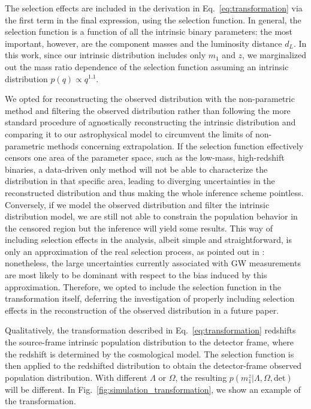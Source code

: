 \documentclass[sn-aps, pdflatex, iicol]{sn-jnl}
\begin{document}
The selection effects are included in the derivation in Eq.~\eqref{eq:transformation} via the first term in the final expression, using the selection function.
In general, the selection function is a function of all the intrinsic binary parameters: the most important, however, are the component masses and the luminosity distance $d_L$.
In this work, since our intrinsic distribution includes only $m_1$ and $z$, we marginalized out the mass ratio dependence of the selection function assuming an intrinsic distribution $p(q) \propto q^{1.1}$.

We opted for reconstructing the observed distribution with the non-parametric method and filtering the observed distribution rather than following the more standard procedure of agnostically reconstructing the intrinsic distribution and comparing it to our astrophysical model to circumvent the limits of non-parametric methods concerning extrapolation.
If the selection function effectively censors one area of the parameter space, such as the low-mass, high-redshift binaries, a data-driven only method will not be able to characterize the distribution in that specific area, leading to diverging uncertainties in the reconstructed distribution and thus making the whole inference scheme pointless. Conversely, if we model the observed distribution and filter the intrinsic distribution model, we are still not able to constrain the population behavior in the censored region but the inference will yield some results.
This way of including selection effects in the analysis, albeit simple and straightforward, is only an approximation of the real selection process, as pointed out in \cite{Essick:2023upv}: nonetheless, the large uncertainties currently associated with \ac{GW} measurements are most likely to be dominant with respect to the bias induced by this approximation.
Therefore, we opted to include the selection function in the transformation itself, deferring the investigation of properly including selection effects in the reconstruction of the observed distribution in a future paper.

Qualitatively, the transformation described in Eq.~\eqref{eq:transformation} redshifts the source-frame intrinsic population distribution to the detector frame, where the redshift is determined by the cosmological model.
The selection function is then applied to the redshifted distribution to obtain the detector-frame observed population distribution.
With different $\Lambda$ or $\Omega$, the resulting $p(m^z_1|\Lambda, \Omega, \mathrm{det})$ will be different.
In Fig.~\ref{fig:simulation_transformation}, we show an example of the transformation.
\end{document}
